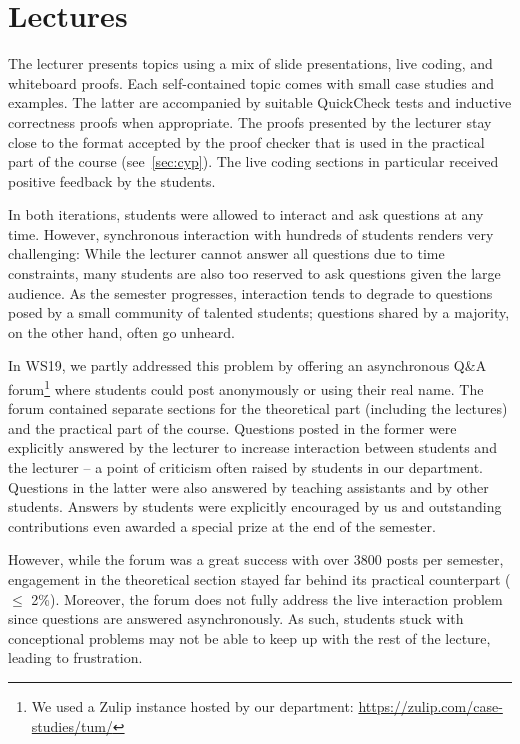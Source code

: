 \section{Lectures}\label{sec:lectures}

The lecturer presents topics using a mix of
slide presentations,
live coding, and whiteboard proofs.
Each self-contained topic comes with small case studies and examples.
The latter are accompanied by suitable QuickCheck tests
and inductive correctness proofs when appropriate.
The proofs presented by the lecturer stay close to the format accepted by the proof checker that is used in the practical part of the course (see~\cref{sec:cyp}).
The live coding sections in particular received positive feedback by the students.

In both iterations, students were allowed to interact and ask questions at any time.
However, synchronous interaction with hundreds of students renders very challenging:
While the lecturer cannot answer all questions due to time constraints,
many students are also too reserved to ask questions given the large audience.
As the semester progresses, interaction tends to degrade to
questions posed by a small community of talented students;
questions shared by a majority, on the other hand, often go unheard.

In WS19, we partly addressed this problem by offering an asynchronous Q\&A forum\footnote{We used a Zulip instance hosted by our department: \url{https://zulip.com/case-studies/tum/}}
where students could post anonymously or using their real name.
The forum contained separate sections for the theoretical part (including the lectures)
and the practical part of the course.
Questions posted in the former were explicitly answered by the lecturer
to increase interaction between students and the lecturer -- a point of criticism often raised by students in our department.
Questions in the latter were also answered by teaching assistants and by other students.
Answers by students were explicitly encouraged by us and
outstanding contributions even awarded a special prize at the end of the semester.

However, while the forum was a great success with over 3800 posts per semester,
engagement in the theoretical section stayed far behind its practical counterpart ($\leq$ 2\%).
Moreover, the forum does not fully address the live interaction problem since
questions are answered asynchronously.
As such, students stuck with conceptional problems may not be able
to keep up with the rest of the lecture,
leading to frustration.

